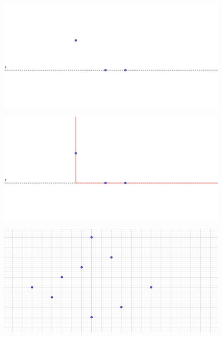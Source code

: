 \documentclass{beamer}
\begin{document}
\begin{frame}
\begin{figure}[h]
\includegraphics[width=\textwidth]{Posicion-general}
\end{figure}
\end{frame}
\begin{frame}
\begin{figure}[h]
\includegraphics[width=\textwidth]{Posicion-general-2}
\end{figure}
\end{frame}
\begin{frame}
\begin{figure}[h]
\includegraphics[width=\textwidth]{Prueba-misma-vertical}
\end{figure}
\end{frame}
\end{document}
